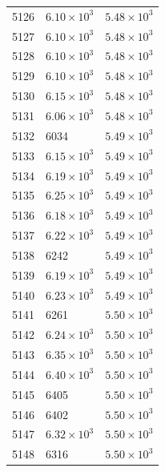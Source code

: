 \begin{table}[H]
\begin{tabular}{lll}
5126 & $\displaystyle 6.10 \times 10^{3}$ & $\displaystyle 5.48 \times 10^{3}$ \\
5127 & $\displaystyle 6.10 \times 10^{3}$ & $\displaystyle 5.48 \times 10^{3}$ \\
5128 & $\displaystyle 6.10 \times 10^{3}$ & $\displaystyle 5.48 \times 10^{3}$ \\
5129 & $\displaystyle 6.10 \times 10^{3}$ & $\displaystyle 5.48 \times 10^{3}$ \\
5130 & $\displaystyle 6.15 \times 10^{3}$ & $\displaystyle 5.48 \times 10^{3}$ \\
5131 & $\displaystyle 6.06 \times 10^{3}$ & $\displaystyle 5.48 \times 10^{3}$ \\
5132 & 6034 & $\displaystyle 5.49 \times 10^{3}$ \\
5133 & $\displaystyle 6.15 \times 10^{3}$ & $\displaystyle 5.49 \times 10^{3}$ \\
5134 & $\displaystyle 6.19 \times 10^{3}$ & $\displaystyle 5.49 \times 10^{3}$ \\
5135 & $\displaystyle 6.25 \times 10^{3}$ & $\displaystyle 5.49 \times 10^{3}$ \\
5136 & $\displaystyle 6.18 \times 10^{3}$ & $\displaystyle 5.49 \times 10^{3}$ \\
5137 & $\displaystyle 6.22 \times 10^{3}$ & $\displaystyle 5.49 \times 10^{3}$ \\
5138 & 6242 & $\displaystyle 5.49 \times 10^{3}$ \\
5139 & $\displaystyle 6.19 \times 10^{3}$ & $\displaystyle 5.49 \times 10^{3}$ \\
5140 & $\displaystyle 6.23 \times 10^{3}$ & $\displaystyle 5.49 \times 10^{3}$ \\
5141 & 6261 & $\displaystyle 5.50 \times 10^{3}$ \\
5142 & $\displaystyle 6.24 \times 10^{3}$ & $\displaystyle 5.50 \times 10^{3}$ \\
5143 & $\displaystyle 6.35 \times 10^{3}$ & $\displaystyle 5.50 \times 10^{3}$ \\
5144 & $\displaystyle 6.40 \times 10^{3}$ & $\displaystyle 5.50 \times 10^{3}$ \\
5145 & 6405 & $\displaystyle 5.50 \times 10^{3}$ \\
5146 & 6402 & $\displaystyle 5.50 \times 10^{3}$ \\
5147 & $\displaystyle 6.32 \times 10^{3}$ & $\displaystyle 5.50 \times 10^{3}$ \\
5148 & 6316 & $\displaystyle 5.50 \times 10^{3}$ \\

\end{tabular}
\end{table}
